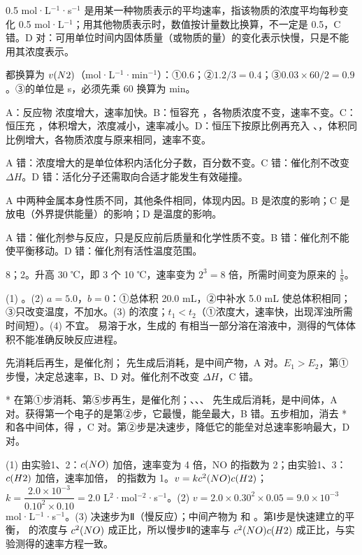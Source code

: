 \begin{jiexilist}
\item {}0.5 mol·L$^{-1}$·s$^{-1}$ 是用某一种物质表示的平均速率，指该物质的浓度平均每秒变化 0.5 mol·L$^{-1}$；用其他物质表示时，数值按计量数比换算，不一定是 0.5，C 错。D 对：可用单位时间内固体质量（或物质的量）的变化表示快慢，只是不能用其浓度表示。
\item {}都换算为 $v(N2)$（mol·L$^{-1}$·min$^{-1}$）：①0.6；②$1.2/3=0.4$；③$0.03\times60/2=0.9$。③的单位是 s，必须先乘 60 换算为 min。
\item {}A：反应物  浓度增大，速率加快。B：恒容充 ，各物质浓度不变，速率不变。C：恒压充 ，体积增大，浓度减小，速率减小。D：恒压下按原比例再充入 、，体积同比例增大，各物质浓度与原来相同，速率不变。
\item {}A 错：浓度增大的是单位体积内活化分子数，百分数不变。C 错：催化剂不改变 $\Delta H$。D 错：活化分子还需取向合适才能发生有效碰撞。
\item {}A 中两种金属本身性质不同，其他条件相同，体现内因。B 是浓度的影响；C 是放电（外界提供能量）的影响；D 是温度的影响。
\item {}A 错：催化剂参与反应，只是反应前后质量和化学性质不变。B 错：催化剂不能使平衡移动。D 错：催化剂有活性温度范围。
\item 8；2。升高 30 ℃，即 3 个 10 ℃，速率变为 $2^3=8$ 倍，所需时间变为原来的 $\frac18$。
\item (1) 。(2) $a=5.0$，$b=0$：①总体积 20.0 mL，②中补水 5.0 mL 使总体积相同；③只改变温度，不加水。(3)  的浓度；$t_1<t_2$（①浓度大，速率快，出现浑浊所需时间短）。(4) 不宜。 易溶于水，生成的  有相当一部分溶在溶液中，测得的气体体积不能准确反映反应进程。
\item {} 先消耗后再生，是催化剂； 先生成后消耗，是中间产物，A 对。$E_1>E_2$，第①步慢，决定总速率，B、D 对。催化剂不改变 $\Delta H$，C 错。
\item {}* 在第①步消耗、第⑤步再生，是催化剂；、、、 先生成后消耗，是中间体，A 对。获得第一个电子的是第②步，它最慢，能垒最大，B 错。五步相加，消去 * 和各中间体，得 ，C 对。第②步是决速步，降低它的能垒对总速率影响最大，D 对。
\item (1) 由实验1、2：$c(NO)$ 加倍，速率变为 4 倍，NO 的指数为 2；由实验1、3：$c(H2)$ 加倍，速率加倍， 的指数为 1。$v=kc^2(NO)c(H2)$；$k=\dfrac{2.0\times10^{-3}}{0.10^2\times0.10}=2.0$ L$^2$·mol$^{-2}$·s$^{-1}$。(2) $v=2.0\times0.30^2\times0.05=9.0\times10^{-3}$ mol·L$^{-1}$·s$^{-1}$。(3) 决速步为Ⅱ（慢反应）；中间产物为  和 。第Ⅰ步是快速建立的平衡， 的浓度与 $c^2(NO)$ 成正比，所以慢步Ⅱ的速率与 $c^2(NO)c(H2)$ 成正比，与实验测得的速率方程一致。

\end{jiexilist}
